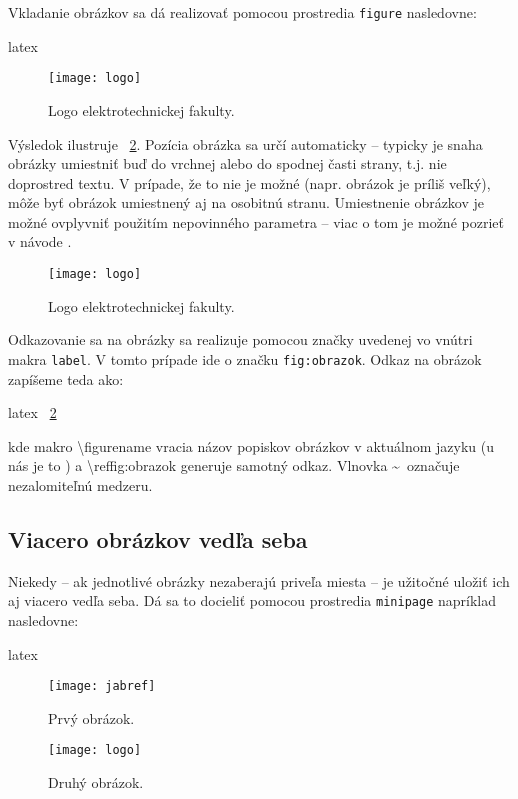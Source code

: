 Vkladanie obrázkov sa dá realizovať pomocou prostredia \texttt{figure} nasledovne:
\begin{inlinecode}[breaklines=True]{latex}
\begin{figure}
\centering
\texttt{[image: logo]}
\caption{Logo elektrotechnickej fakulty.}
\label{fig:obrazok}
\end{figure}
\end{inlinecode}

Výsledok ilustruje \figurename~\ref{fig:obrazok}. Pozícia obrázka sa určí automaticky -- typicky je snaha obrázky umiestniť buď do vrchnej alebo do spodnej časti strany, t.j. nie doprostred textu. V prípade, že to nie je možné (napr. obrázok je príliš veľký), môže byť obrázok umiestnený aj na osobitnú stranu. Umiestnenie obrázkov je možné ovplyvniť použitím nepovinného parametra -- viac o tom je možné pozrieť v návode \cite{latexFigures}.

\begin{figure}
\centering
\texttt{[image: logo]}
\caption{Logo elektrotechnickej fakulty.}
\label{fig:obrazok}
\end{figure}

Odkazovanie sa na obrázky sa realizuje pomocou značky uvedenej vo vnútri makra \texttt{label}. V tomto prípade ide o značku \texttt{fig:obrazok}. Odkaz na obrázok zapíšeme teda ako:
\begin{inlinecode}[breaklines=True]{latex}
\figurename~\ref{fig:obrazok}
\end{inlinecode}
kde makro {\textbackslash}figurename vracia názov popiskov obrázkov v aktuálnom jazyku (u nás je to \figurename) a {\textbackslash}ref{fig:obrazok} generuje samotný odkaz. Vlnovka \textasciitilde\ označuje nezalomiteľnú medzeru.

\subsection{Viacero obrázkov vedľa seba}

Niekedy -- ak jednotlivé obrázky nezaberajú priveľa miesta -- je užitočné uložiť ich aj viacero vedľa seba. Dá sa to docieliť pomocou prostredia \texttt{minipage} napríklad nasledovne:
\begin{inlinecode}[breaklines=True]{latex}
\begin{figure}
\centering
\begin{minipage}[b]{0.58\textwidth}
\centering
\texttt{[image: jabref]}
\caption{Prvý obrázok.}
\label{fig:mini1}
\end{minipage}\quad
\begin{minipage}[b]{0.38\textwidth}
\centering
\texttt{[image: logo]}
\caption{Druhý obrázok.}
\label{fig:mini2}
\end{minipage}
\end{figure}
\end{inlinecode}

